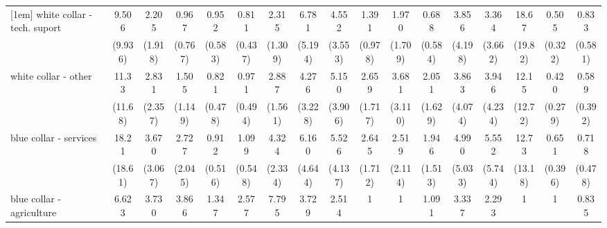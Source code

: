 {\begin{tabular}{l*{16}{c}}
[1em]
white collar - tech. suport&       9.506\sym{*}  &       2.205         &       0.967         &       0.952         &       0.811         &       2.315         &       6.781\sym{*}  &       4.552         &       1.391         &       1.970         &       0.688         &       3.856         &       3.364         &       18.67\sym{**} &       0.505         &       0.833         \\
                    &     (9.936)         &     (1.918)         &     (0.767)         &     (0.583)         &     (0.437)         &     (1.309)         &     (5.194)         &     (3.553)         &     (0.978)         &     (1.709)         &     (0.584)         &     (4.198)         &     (3.662)         &     (19.82)         &     (0.322)         &     (0.581)         \\
[1em]
white collar - other&       11.33\sym{*}  &       2.831         &       1.505         &       0.821         &       0.971         &       2.887\sym{*}  &       4.276         &       5.150\sym{*}  &       2.659         &       3.681         &       2.051         &       3.863         &       3.946         &       12.15\sym{*}  &       0.420         &       0.589         \\
                    &     (11.68)         &     (2.357)         &     (1.149)         &     (0.478)         &     (0.494)         &     (1.561)         &     (3.228)         &     (3.906)         &     (1.717)         &     (3.110)         &     (1.629)         &     (4.074)         &     (4.234)         &     (12.72)         &     (0.279)         &     (0.392)         \\
[1em]
blue collar - services&       18.21\sym{**} &       3.670         &       2.727         &       0.912         &       1.099         &       4.324\sym{**} &       6.160\sym{*}  &       5.526\sym{*}  &       2.645         &       2.519         &       1.946         &       4.990         &       5.552         &       12.73\sym{*}  &       0.651         &       0.718         \\
                    &     (18.61)         &     (3.067)         &     (2.045)         &     (0.516)         &     (0.548)         &     (2.334)         &     (4.644)         &     (4.137)         &     (1.712)         &     (2.114)         &     (1.513)         &     (5.033)         &     (5.744)         &     (13.18)         &     (0.396)         &     (0.478)         \\
[1em]
blue collar - agriculture&       6.623         &       3.730         &       3.866         &       1.347         &       2.577         &       7.795\sym{**} &       3.729         &       2.514         &           1         &           1         &       1.091         &       3.337         &       2.293         &           1         &           1         &       0.835         \\

\end{tabular}}
